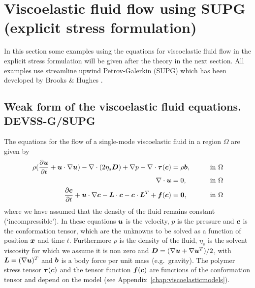 
\def\headdate{14th October 2022}

\section{Viscoelastic fluid flow using SUPG (explicit stress formulation)}
\label{sec:explicitstress}

In this section some examples using the equations for viscoelastic fluid flow
in the explicit stress formulation 
will be given after the theory in the next section.
All examples use streamline upwind Petrov-Galerkin (SUPG)
which has been developed by Brooks \& Hughes \cite{Brooks82}.

\subsection{Weak form of the viscoelastic fluid equations. DEVSS-G/SUPG}
\label{sec:weakviscoelastic}

The equations for the flow of a single-mode viscoelastic fluid
in a region $\Omega$ are given by
\begin{alignat}{2}
  \rho(\dfrac{\partial \boldsymbol{u}}{\partial t}+\boldsymbol{u}\cdot\nabla\boldsymbol{u})
      -\nabla\cdot(2\eta_s\boldsymbol{D})+\nabla p-\nabla\cdot\boldsymbol{\tau}(\boldsymbol{c})
        &=\rho\boldsymbol{b},\qquad&&\text{in }\Omega\label{eq:ve1}\\
\nabla\cdot\boldsymbol{u}&=0,\qquad&&\text{in }\Omega\\
        \dfrac{\partial \boldsymbol{c}}{\partial t}
+\boldsymbol{u}\cdot\nabla\boldsymbol{c}-\boldsymbol{L}\cdot\boldsymbol{c}-\boldsymbol{c}\cdot\boldsymbol{L}^T
 +\boldsymbol{f}(\boldsymbol{c})&=\boldsymbol{0},\qquad&&\text{in }\Omega\label{eq:ve3}
\end{alignat}
where we have assumed that the density of the fluid remains constant
(`incompressible'). In these equations $\boldsymbol{u}$ is the velocity, $p$ is the
pressure and $\boldsymbol{c}$ is the conformation tensor, which are the unknowns to be
solved as a function of position $\boldsymbol{x}$ and time $t$. Furthermore $\rho$ is
the density of the fluid, $\eta_s$ is the solvent viscosity for which we
assume it is non zero and
 $\boldsymbol{D}=(\nabla\boldsymbol{u}+\nabla\boldsymbol{u}^T)/2$, with $\boldsymbol{L}=(\nabla\boldsymbol{u})^T$ and
$\boldsymbol{b}$ is a body force per unit mass (e.g.\ gravity).
The polymer stress tensor $\boldsymbol{\tau}(\boldsymbol{c})$ and the tensor function 
$\boldsymbol{f}(\boldsymbol{c})$ are 
functions of the conformation tensor and depend on the model (see
Appendix~\ref{chap:viscoelasticmodels}).

